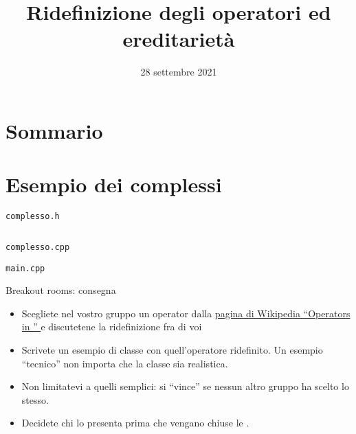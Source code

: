 \documentclass[xcolor={dvipsnames, svgnames, x11names, table}, 10pt]{beamer}
\title{Ridefinizione degli operatori ed ereditarietà}
\date{28 settembre 2021}
\begin{document}
\frame{\titlepage}

\section*{Sommario}
\begin{frame}
    \tableofcontents[pausesections]
\end{frame}

\section{Esempio dei complessi}

\begin{frame}[fragile]{\texttt{complesso.h}}

\begin{columns}
    \column{\dimexpr\paperwidth-30pt}
\end{columns}
\vspace*{\fill}

\end{frame}

\begin{frame}[fragile]{\texttt{complesso.cpp}}


\end{frame}

\begin{frame}[fragile]{\texttt{main.cpp}}


\end{frame}

\begin{frame}{Breakout rooms: consegna}
    \begin{itemize}
        \item Scegliete nel vostro gruppo un operator dalla \href{https://en.wikipedia.org/wiki/Operators\_in\_C\_and\_C\%2B\%2B}{pagina di Wikipedia \enquote{Operators in \cplusplus} \ExternalLink} e discutetene la ridefinizione fra di voi
        \item Scrivete un esempio di classe con quell'operatore ridefinito. Un esempio \enquote{tecnico} non importa che la classe sia realistica.
        \item Non limitatevi a quelli semplici: si \enquote{vince} se nessun altro gruppo ha scelto lo stesso.
        \item Decidete chi lo presenta prima che vengano chiuse le .
    \end{itemize}
\end{frame}
\end{document}
